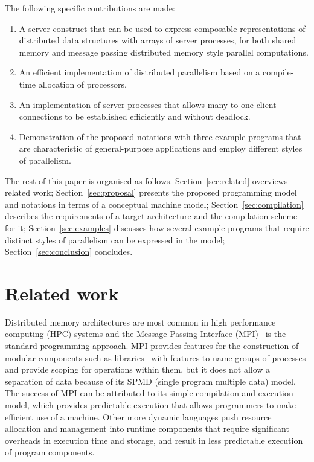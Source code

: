 \documentclass[11pt, conference, compsocconf, onecolumn]{IEEEtran}
\newcommand{\ben}{\begin{enumerate}}
\newcommand{\een}{\end{enumerate}}
\newcommand{\sect}[1]{Section~\ref{sec:#1}}
\newcounter{process}
\begin{document}
The following specific contributions are made:
\ben

\item A server construct that can be used to express composable
  representations of distributed data structures with arrays of server
  processes, for both shared memory and message passing distributed memory
  style parallel computations.

\item An efficient implementation of distributed parallelism
  based on a compile-time allocation of processors.

\item An implementation of server processes that allows many-to-one client
  connections to be established efficiently and without deadlock.

\item Demonstration of the proposed notations with three example programs that
  are characteristic of general-purpose applications and employ different
  styles of parallelism. 

\een

The rest of this paper is organised as follows.
\sect{related} overviews related work;
\sect{proposal} presents the proposed programming model and notations in terms
of a conceptual machine model;
\sect{compilation} describes the requirements of a target architecture and the
compilation scheme for it;
\sect{examples} discusses how several example programs that require distinct
styles of parallelism can be expressed in the model;
\sect{conclusion} concludes.






\section{Related work\label{sec:related}}

Distributed memory architectures are most common in high performance computing
(HPC) systems and the Message Passing Interface (MPI)~\cite{MPI2.2} is the
standard programming approach. 
MPI provides features for the construction of modular components such as
libraries~\cite{Skjellum94} with features to name groups of processes and
provide scoping for operations within them, but it does not allow a separation
of data because of its SPMD (single program multiple data) model.
The success of MPI can be attributed to its simple compilation and execution
model, which provides predictable execution that allows programmers to make
efficient use of a machine. Other more dynamic languages push resource
allocation and management into runtime components that require significant
overheads in execution time and storage, and result in less predictable
execution of program components.
\end{document}
